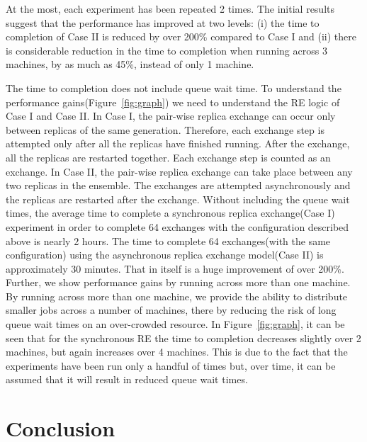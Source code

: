 \documentclass[a4paper,10pt]{article}
\newcommand{\athotanote}[1]{ {\textcolor{green} { ***athota: #1 }}}
\newcommand{\athotanote}[1]{}
\begin{document}
At the most, each experiment has been repeated 2 times. 
The initial results suggest that the performance has improved at two levels: (i) the time to completion of Case II is reduced by over 200\% compared to Case I and (ii) there is considerable reduction in the time to completion when running across 3 machines, by as much as 45\%, instead of only 1 machine. 

The time to completion does not include queue wait time. To understand the performance gains(Figure~\ref{fig:graph}) we need to understand the RE logic of Case I and Case II. In Case I, the pair-wise replica exchange can occur only between replicas of the same generation. Therefore, each exchange step is attempted only after all the replicas have finished running. After the exchange, all the replicas are restarted together. Each exchange step is counted as an exchange.
In Case II, the pair-wise replica exchange can take place between any two replicas in the ensemble. The exchanges are attempted asynchronously and the replicas are restarted after the exchange.
Without including the queue wait times, the average time to complete a synchronous replica exchange(Case I) experiment in order to complete 64 exchanges with the configuration described above is nearly 2 hours. The time to complete 64 exchanges(with the same configuration) using the asynchronous replica exchange model(Case II) is approximately 30 minutes. That in itself is a huge improvement of over 200\%.
Further, we show performance gains by running across more than one machine. By running across more than one machine, we provide the ability to distribute smaller jobs across a number of machines, there by reducing the risk of long queue wait times on an over-crowded resource. In Figure~\ref{fig:graph}, it can be seen that for the synchronous RE the time to completion decreases slightly over 2 machines, but again increases over 4 machines. This is due to the fact that the experiments have been run only a handful of times but, over time, it can be assumed that it will result in reduced queue wait times.

\section{Conclusion}



\end{document}
